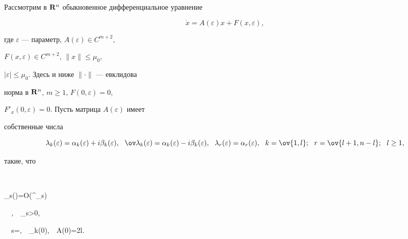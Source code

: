  


\date{} 




\pagestyle{plain} %


 




\maketitle 


\label{begin} 


 


Рассмотрим в $\bold R^n$ обыкновенное дифференциальное уравнение 


\begin{equation} 


\Dot x=A(\varepsilon)x+F(x,\varepsilon), 


\end{equation} 


где $\varepsilon$ --- параметр, $A(\varepsilon)\in C^{m+2}$, 


$F(x,\varepsilon)\in C^{m+2}$, $\|x\|\le\mu_0$, 


$|\varepsilon|\le\mu_0$. Здесь и ниже $\|\cdot\|$ --- евклидова 


норма в $\bold R^n$, $m\ge1$, $F(0,\varepsilon)=0$, 


$F'_x(0,\varepsilon)=0$. Пусть матрица $A(\varepsilon)$ имеет 


собственные числа 


$$ 


\lambda_k(\varepsilon)=\alpha_k(\varepsilon)+ 


i \beta_k(\varepsilon),\ \ \ov\lambda_k(\varepsilon)= 


\alpha_k(\varepsilon)-i \beta_k(\varepsilon),\ \ 


\lambda_r(\varepsilon)=\alpha_r(\varepsilon), 


\ \ k=\ov{1,l};\ \ r=\ov{l+1,n-l}; \ \ l\ge1, 


$$ 


такие, что 


$$ 


\alpha_s(\varepsilon)=O(\varepsilon^{\rho_s})\ \ 


 \ \ \varepsilon{},\ \ \rho_s>0, 


\ \ s=,\ \ \beta_k(0),\ \ \rang A(0)=2l. 


